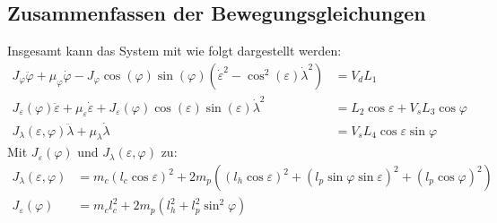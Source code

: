 \documentclass[times, 10pt,twocolumn]{article}
\begin{document}
	\subsection{Zusammenfassen der Bewegungsgleichungen}
	Insgesamt kann das System mit wie folgt dargestellt werden:
	\begin{align}
	J_\varphi \ddot{\varphi} + \mu_\varphi \dot{\varphi} - J_\varphi \cos (\varphi) \sin (\varphi) (\dot{\varepsilon}^2- \cos^2 (\varepsilon) \dot{\lambda}^2) &= V_d L_1\\
	J_\varepsilon(\varphi)\ddot{\varepsilon} + \mu_\varepsilon \dot{\varepsilon} + J_\varepsilon(\varphi) \cos (\varepsilon) \sin (\varepsilon) \dot{\lambda}^2 
	&= L_2 \cos \varepsilon + V_s L_3 \cos \varphi\\
	J_\lambda(\varepsilon,\varphi) \ddot{\lambda} + \mu_\lambda \dot{\lambda} &= V_s L_4 \cos \varepsilon \sin \varphi
	\end{align}
	Mit $J_\varepsilon(\varphi)$ und $	J_\lambda(\varepsilon,\varphi)$ zu:
	\begin{align}
	J_\lambda(\varepsilon,\varphi) &= m_c (l_c \cos \varepsilon)^2
	+ 2 m_p((l_h \cos \varepsilon)^2 + (l_p \sin \varphi \sin \varepsilon)^2+(l_p \cos \varphi)^2)\\
	J_\varepsilon(\varphi) &= m_cl_c^2+ 2 m_p(l_h^2+l_p^2\sin^2 \varphi)
	\end{align}
\end{document}
